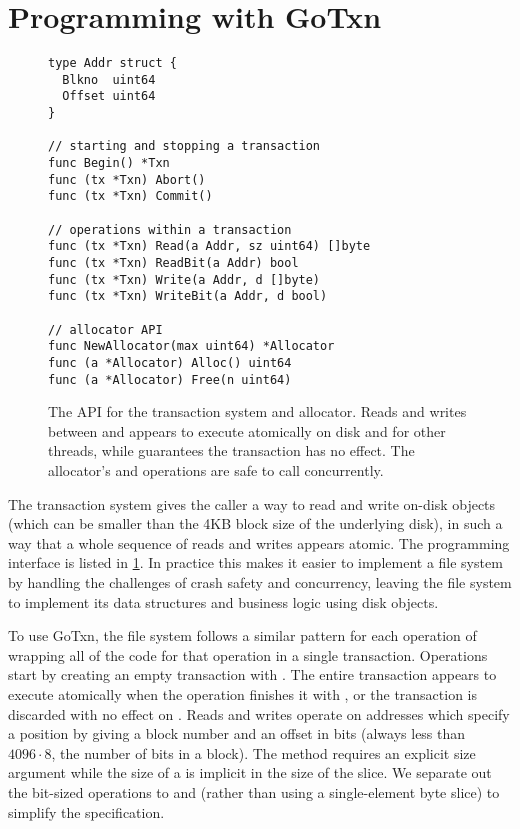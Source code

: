 \section{Programming with GoTxn}
\label{s:gotxn-api}

\begin{figure}
\begin{verbatim}
type Addr struct {
  Blkno  uint64
  Offset uint64
}

// starting and stopping a transaction
func Begin() *Txn
func (tx *Txn) Abort()
func (tx *Txn) Commit()

// operations within a transaction
func (tx *Txn) Read(a Addr, sz uint64) []byte
func (tx *Txn) ReadBit(a Addr) bool
func (tx *Txn) Write(a Addr, d []byte)
func (tx *Txn) WriteBit(a Addr, d bool)

// allocator API
func NewAllocator(max uint64) *Allocator
func (a *Allocator) Alloc() uint64
func (a *Allocator) Free(n uint64)
\end{verbatim}
  \caption{The API for the transaction system and allocator. Reads and writes
    between  and  appears to execute atomically on disk and
    for other threads, while  guarantees the transaction has no
    effect. The allocator's  and  operations are safe to call
    concurrently.}
\label{fig:txn-api}
\end{figure}

The transaction system gives the caller a way to read and write on-disk
objects (which can be smaller than the 4KB block size of the underlying disk),
in such a way that a whole sequence of reads and writes appears atomic. The
programming interface is listed in \cref{fig:txn-api}. In practice this makes
it easier to implement a file system by handling the challenges of crash safety
and concurrency, leaving the file system to implement its data structures and
business logic using disk objects.

To use GoTxn, the file system follows a similar pattern for each operation of
wrapping all of the code for that operation in a single transaction. Operations
start by creating an empty transaction with .
The entire
transaction appears to execute atomically when the operation finishes it
with , or the transaction is discarded with no effect on
. Reads and writes operate on addresses which specify a
position by giving a block number and an offset in bits (always less
than $4096 \cdot 8$, the number of bits in a block). The 
method requires an explicit size argument while the size of a
 is implicit in the size of the  slice. We separate
out the bit-sized operations to  and  (rather
than using a single-element byte slice) to simplify the specification.

